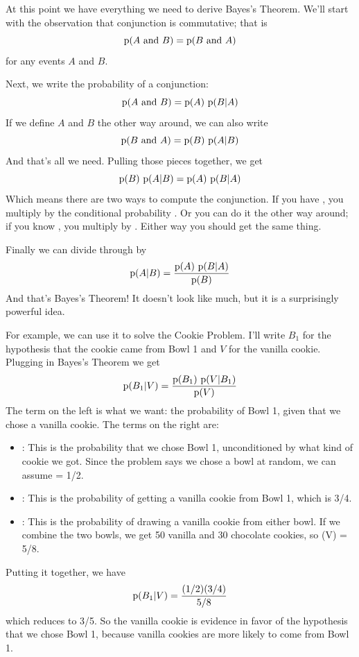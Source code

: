 \documentclass[12pt]{book}
\begin{document}
At this point we have everything we need to derive Bayes's Theorem.
We'll start with the observation that conjunction is commutative; that is
%
\[ \mathrm{p}(A ~\mathrm{and}~ B) = \mathrm{p}(B ~\mathrm{and}~ A) \]
%
for any events $A$ and $B$.

Next, we write the probability of a conjunction:
%
\[ \mathrm{p}(A ~\mathrm{and}~ B) = \mathrm{p}(A)~\mathrm{p}(B|A) \]
%
If we define $A$ and $B$ the other way around, we can also write
%
\[ \mathrm{p}(B ~\mathrm{and}~ A) = \mathrm{p}(B)~\mathrm{p}(A|B) \]
%
And that's all we need.  Pulling those pieces together, we get
%
\[ \mathrm{p}(B)~\mathrm{p}(A|B) = \mathrm{p}(A)~\mathrm{p}(B|A) \]
%
Which means there are two ways to compute the conjunction.
If you have , you multiply by the conditional
probability .  Or you can do it the other way around; if you
know , you multiply by .  Either way you should get
the same thing.

Finally we can divide through by 
%
\[ \mathrm{p}(A|B) = \frac{\mathrm{p}(A)~\mathrm{p}(B|A)}{\mathrm{p}(B)} \]
%
And that's Bayes's Theorem!  It doesn't look like much, but
it is a surprisingly powerful idea.

For example, we can use it to solve the Cookie Problem.  I'll write
$B_1$ for the hypothesis that the cookie came from Bowl 1
and $V$ for the vanilla cookie.  Plugging in Bayes's Theorem
we get
%
\[ \mathrm{p}(B_1|V) = \frac{\mathrm{p}(B_1)~\mathrm{p}(V|B_1)}{\mathrm{p}(V)} \]
%
The term on the left is what we want: the probability of Bowl 1, given
that we chose a vanilla cookie.  The terms on the right are:

\begin{itemize}

\item {}: This is the probability that we chose Bowl 1, unconditioned
by what kind of cookie we got.  Since the problem says we chose a
bowl at random, we can assume  = 1/2.

\item {}: This is the probability of getting a vanilla cookie
from Bowl 1, which is 3/4.

\item {}: This is the probability of drawing a vanilla cookie from
either bowl.  If we combine the two bowls, we get 50 vanilla and 30
chocolate cookies, so \p(V) = 5/8.

\end{itemize}

Putting it together, we have 
%
\[ \mathrm{p}(B_1|V) = \frac{(1/2)(3/4)}{5/8} \]
%
which reduces to 3/5.  So the vanilla cookie is evidence in favor of
the hypothesis that we chose Bowl 1, because vanilla cookies are more
likely to come from Bowl 1.
\end{document}
